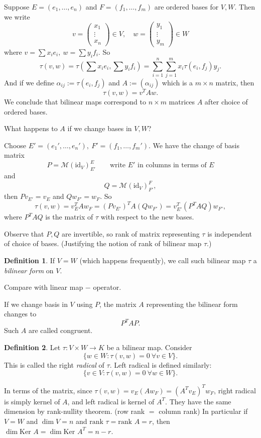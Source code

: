 \documentclass[a4paper]{article}
\newcommand{\Ker}{\text{Ker }}
\newcommand{\id}{\text{id}}
\newcommand{\rank}{\text{rank }}
\theoremstyle{definition}
\newtheorem{defn}{Definition}[subsection]
\begin{document}
Suppose $E=(e_1,\ldots,e_n)$ and $F=(f_1,\ldots,f_m)$ are ordered bases for $V,W$. Then we write
\[
v=\begin{pmatrix}x_1\\ \vdots  \\ x_n\end{pmatrix} \in V,\quad w=\begin{pmatrix}y_1\\ \vdots  \\ y_m\end{pmatrix}\in W
\]
where $v=\sum x_i e_i,\ w=\sum y_i f_i$. So
\[
\tau (v,w) = \tau \left(\sum x_i e_i, \sum y_i f_i \right)=\sum_{i=1}^n \sum_{j=1}^m x_i \tau (e_i,f_j) y_j .
\]
And if we define $\alpha_{ij} := \tau (e_i,f_j)$ and $A:= \left(\alpha_{ij}\right)$ which is a $m\times n$ matrix, then
\[
\tau (v,w)=v^T Aw .
\]
We conclude that bilinear maps correspond to $n\times m$ matrices $A$ after choice of ordered bases.

What happens to $A$ if we change bases in $V,W$?

Choose $E'=(e_1',\ldots,e_n'),\ F'=(f_1,\ldots,f_m')$. We have the change of basis matrix
\[
P=\mathcal M (\id _V)_{E'}^E \qquad \text{write }E' \text{ in columns in terms of }E
\]
and
\[
Q=\mathcal M (\id _V)_{F'}^F,
\]
then $Pv_{E'} = v_E$ and $Qw_{F'}=w_F$. So
\[
\tau (v,w) = v_E^T A w_F= \left(P v_{E'} \right)^T A \left(Qw_{F'} \right)=v_{E'}^T \left(P^T AQ\right)w_{F'} ,
\]
where $P^T AQ$ is the matrix of $\tau$ with respect to the new bases.

Observe that $P,Q$ are invertible, so rank of matrix representing $\tau$ is independent of choice of bases. (Justifying the notion of rank of bilinear map $\tau$.)

\begin{defn}
    If $V=W$ (which happens frequently), we call such bilinear map $\tau$ a \textit{bilinear form} on $V$.
\end{defn}
Compare with linear map $-$ operator.

If we change basis in $V$ using $P$, the matrix $A$ representing the bilinear form changes to
\[
P^TAP .
\]
Such $A$ are called congruent.

\begin{defn}
    Let $\tau :V\times W\rightarrow K$ be a bilinear map. Consider
\[
\{w\in W: \tau (v,w)=0 \ \forall v\in V\}.
\]
This is called the right \textit{radical} of $\tau$. Left radical is defined similarly:
\[
\{v\in V:\tau(v,w)=0 \ \forall w\in W\} .
\]
\end{defn}
In terms of the matrix, since $\tau (v,w)=v_E \left(Aw_F\right)=\left(A^T v_E\right)^T w_F$, right radical is simply kernel of $A$, and left radical is kernel of $A^T$. They have the same dimension by rank-nullity theorem. (row rank $=$ column rank) In particular if $V=W$ and $\dim V=n$ and $\rank \tau =\rank A=r$, then $\dim \Ker A =\dim \Ker A^T=n-r$. \\
\end{document}
